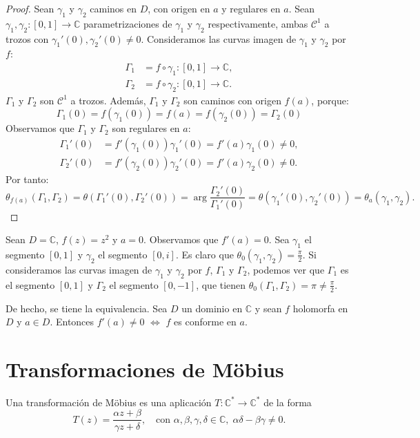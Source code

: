 \begin{proof}
    Sean $\gamma_1$ y $\gamma_2$ caminos en $D$, con origen en $a$ y regulares en $a$.
    Sean $\gamma_1, \gamma_2: [0, 1] \to \mathbb{C}$ parametrizaciones de $\gamma_1$ y $\gamma_2$ respectivamente, ambas $\mathcal{C}^1$ a trozos con $\gamma_1'(0), \gamma_2'(0) \neq 0$.
    Consideramos las curvas imagen de $\gamma_1$ y $\gamma_2$ por $f$:
    \begin{align*}
        \Gamma_1 & = f \circ \gamma_1: [0, 1] \to \mathbb{C}, \\
        \Gamma_2 & = f \circ \gamma_2: [0, 1] \to \mathbb{C}.
    \end{align*}
    $\Gamma_1$ y $\Gamma_2$ son $\mathcal{C}^1$ a trozos.
    Además, $\Gamma_1$ y $\Gamma_2$ son caminos con origen $f(a)$, porque:
    $$\Gamma_1(0) = f(\gamma_1(0)) = f(a) = f(\gamma_2(0)) = \Gamma_2(0)$$
    Observamos que $\Gamma_1$ y $\Gamma_2$ son regulares en $a$:
    \begin{align*}
        \Gamma_1'(0) & = f'(\gamma_1(0))\gamma_1'(0) = f'(a)\gamma_1(0) \neq 0, \\
        \Gamma_2'(0) & = f'(\gamma_2(0))\gamma_2'(0) = f'(a)\gamma_2(0) \neq 0.
    \end{align*}
    Por tanto:
    $$\theta_{f(a)}(\Gamma_1, \Gamma_2) = \theta(\Gamma_1'(0), \Gamma_2'(0)) = \arg \frac{\Gamma_2'(0)}{\Gamma_1'(0)} = \theta(\gamma_1'(0), \gamma_2'(0)) = \theta_a(\gamma_1, \gamma_2).$$
\end{proof}

\begin{example}[Contraejemplo]
    Sean $D = \mathbb{C}$, $f(z) = z^2$ y $a = 0$.
    Observamos que $f'(a) = 0$.
    Sea $\gamma_1$ el segmento $[0, 1]$ y $\gamma_2$ el segmento $[0, i]$.
    Es claro que $\theta_0(\gamma_1, \gamma_2) = \frac{\pi}{2}$.
    Si consideramos las curvas imagen de $\gamma_1$ y $\gamma_2$ por $f$, $\Gamma_1$ y $\Gamma_2$, podemos ver que $\Gamma_1$ es el segmento $[0, 1]$ y $\Gamma_2$ el segmento $[0, -1]$, que tienen $\theta_0(\Gamma_1, \Gamma_2) = \pi \neq \frac{\pi}{2}$.
\end{example}

De hecho, se tiene la equivalencia.
Sea $D$ un dominio en $\mathbb{C}$ y sean $f$ holomorfa en $D$ y $a \in D$.
Entonces $f'(a) \neq 0$ $\Leftrightarrow$ $f$ es conforme en $a$.

\section{Transformaciones de Möbius}
\begin{definition}
    Una transformación de Möbius es una aplicación $T: \mathbb{C}^\ast \to \mathbb{C}^\ast$ de la forma
    $$T(z) = \frac{\alpha z + \beta}{\gamma z + \delta}, \quad \text{con } \alpha, \beta, \gamma, \delta \in \mathbb{C}, \; \alpha\delta - \beta\gamma \neq 0.$$
\end{definition}

